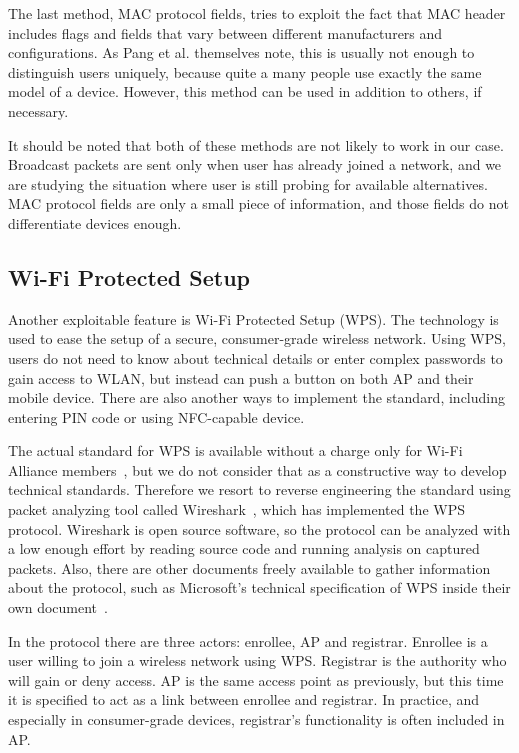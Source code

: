 \documentclass[12pt,a4paper,oneside,pdftex]{report}
\begin{document}
The last method, MAC protocol fields, tries to exploit the fact that MAC header includes flags and fields that vary between different manufacturers and configurations. As Pang et al. themselves note, this is usually not enough to distinguish users uniquely, because quite a many people use exactly the same model of a device. However, this method can be used in addition to others, if necessary.

It should be noted that both of these methods are not likely to work in our case. Broadcast packets are sent only when user has already joined a network, and we are studying the situation where user is still probing for available alternatives. MAC protocol fields are only a small piece of information, and those fields do not differentiate devices enough.

\subsection{Wi-Fi Protected Setup}
\label{sec:wps}

Another exploitable feature is Wi-Fi Protected Setup (WPS). The technology is used to ease the setup of a secure, consumer-grade wireless network. Using WPS, users do not need to know about technical details or enter complex passwords to gain access to WLAN, but instead can push a button on both AP and their mobile device. There are also another ways to implement the standard, including entering PIN code or using NFC-capable device.~\cite{alliance2007wi}

The actual standard for WPS is available without a charge only for Wi-Fi Alliance members~\cite{alliance2007wi}, but we do not consider that as a constructive way to develop technical standards. Therefore we resort to reverse engineering the standard using packet analyzing tool called Wireshark~\cite{wireshark}, which has implemented the WPS protocol. Wireshark is open source software, so the protocol can be analyzed with a low enough effort by reading source code and running analysis on captured packets. Also, there are other documents freely available to gather information about the protocol, such as Microsoft's technical specification of WPS inside their own document~\cite{microsoftWCN}.

In the protocol there are three actors: enrollee, AP and registrar. Enrollee is a user willing to join a wireless network using WPS. Registrar is the authority who will gain or deny access. AP is the same access point as previously, but this time it is specified to act as a link between enrollee and registrar. In practice, and especially in consumer-grade devices, registrar's functionality is often included in AP. 
\end{document}
